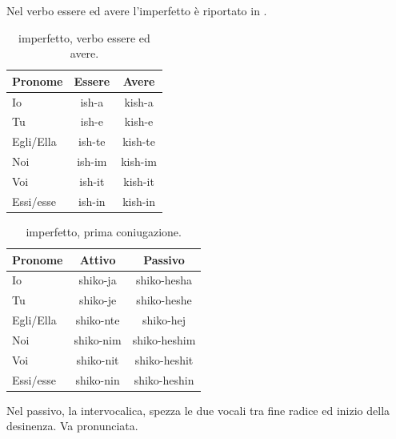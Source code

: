 Nel verbo essere ed avere l'imperfetto è riportato in \cite{studylib:imperfetto}.

\begin{table}[H]
    \centering
    \begin{tabular}{lcc}
        \toprule
        Pronome     &   Essere & Avere \\
        \midrule
        Io          &   ish-a & kish-a \\
        Tu          &   ish-e & kish-e \\
        Egli/Ella   &   ish-te & kish-te \\
        Noi         &   ish-im & kish-im \\
        Voi         &   ish-it & kish-it \\
        Essi/esse   &   ish-in & kish-in \\
        \bottomrule
    \end{tabular}
    \caption{imperfetto, verbo essere ed avere.}
    \label{tbl:verb:imperfettto:essereavere}
\end{table}

\begin{table}[H]
    \centering
    \begin{tabular}{lcc}
        \toprule
        Pronome     &   Attivo & Passivo \\
        \midrule
        Io          &   shiko-ja & shiko-hesha \\
        Tu          &   shiko-je & shiko-heshe \\
        Egli/Ella   &   shiko-nte & shiko-hej \\
        Noi         &   shiko-nim & shiko-heshim \\
        Voi         &   shiko-nit & shiko-heshit \\
        Essi/esse   &   shiko-nin & shiko-heshin \\
        \bottomrule
    \end{tabular}
    \caption{imperfetto, prima coniugazione.}
    \label{tbl:verb:primaconiugazione:imperfetto}
\end{table}

\begin{note}
    Nel passivo, la  intervocalica, spezza le due vocali tra fine radice ed inizio della desinenza. Va pronunciata.
\end{note}

